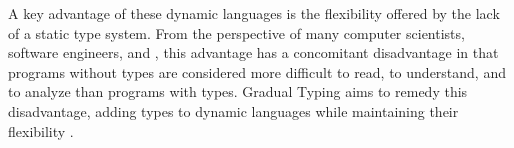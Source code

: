 
A key advantage of these dynamic languages is the flexibility offered
by the lack of a static type system. 
From the perspective of many computer scientists, software engineers,
and , this advantage has a concomitant
disadvantage in that programs without types are considered more
difficult to read, to understand, and to analyze than programs with
types. Gradual Typing aims to remedy this disadvantage, adding types
to dynamic languages while maintaining their flexibility
\citep{GiladPluggable2004,Siek2006,XXXSiek2015}. 

